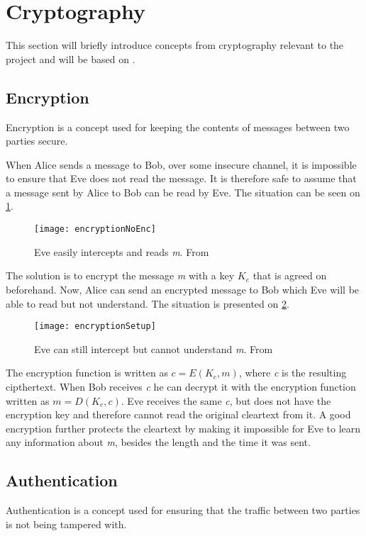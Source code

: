 \section{Cryptography}\label{cryptography}
This section will briefly introduce concepts from cryptography relevant to the project and will be based on \cite{cryptoenginering}.

\subsection{Encryption}
Encryption is a concept used for keeping the contents of messages between two parties secure.

When Alice sends a message to Bob, over some insecure channel, it is impossible to ensure that Eve does not read the message.
It is therefore safe to assume that a message sent by Alice to Bob can be read by Eve.
The situation can be seen on \cref{crypto:noenc}.

\begin{figure}[H]
	\centering
	\texttt{[image: encryptionNoEnc]}
	\caption{Eve easily intercepts and reads \emph{m}. From \citet[p.~50]{cryptoenginering}}
	\label{crypto:noenc}
\end{figure}

The solution is to encrypt the message \emph{m} with a key $K_e$ that is agreed on beforehand.
Now, Alice can send an encrypted message to Bob which Eve will be able to read but not understand.
The situation is presented on \cref{crypto:enc}.

\begin{figure}[H]
	\centering
	\texttt{[image: encryptionSetup]}
	\caption{Eve can still intercept but cannot understand \emph{m}. From \citet[p.~50]{cryptoenginering}}
	\label{crypto:enc}
\end{figure}

The encryption function is written as $c = E(K_e,m)$, where \emph{c} is the resulting cipthertext.
When Bob receives \emph{c} he can decrypt it with the encryption function written as $m = D(K_e,c)$.
Eve receives the same \emph{c}, but does not have the encryption key and therefore cannot read the original cleartext from it.
A good encryption further protects the cleartext by making it impossible for Eve to learn any information about \emph{m}, besides the length and the time it was sent.


\subsection{Authentication}
Authentication is a concept used for ensuring that the traffic between two parties is not being tampered with.

